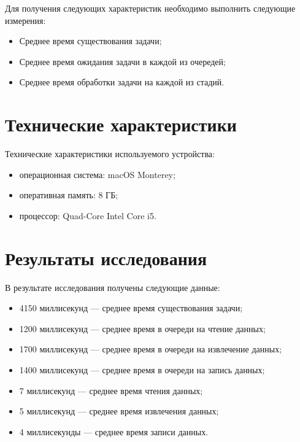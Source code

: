 Для получения следующих характеристик необходимо выполнить следующие измерения:
\begin{itemize}
    \item Среднее время существования задачи;
    \item Среднее время ожидания задачи в каждой из очередей;
    \item Среднее время обработки задачи на каждой из стадий.
\end{itemize}


\section{Технические характеристики}
Технические характеристики используемого устройства:
\begin{itemize} 
    \item операционная система: macOS Monterey;
    \item оперативная память: 8 ГБ;
    \item процессор: Quad-Core Intel Core i5.
\end{itemize}

\section{Результаты исследования}
В результате исследования получены следующие данные:
\begin{itemize}
    \item 4150 миллисекунд — среднее время существования задачи;
    \item 1200 миллисекунд — среднее время в очереди на чтение данных;
    \item 1700 миллисекунд — среднее время в очереди на извлечение данных;
    \item 1400 миллисекунд — среднее время в очереди на запись данных;
    \item 7 миллисекунд — среднее время чтения данных;
    \item 5 миллисекунд — среднее время извлечения данных;
    \item 4 миллисекунды — среднее время записи данных.
\end{itemize}

